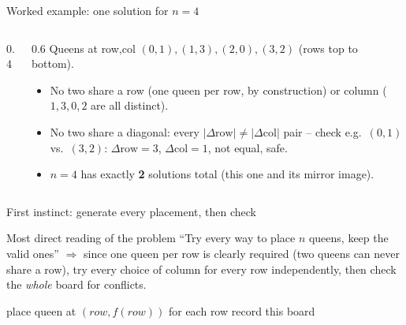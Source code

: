 \documentclass[11pt,aspectratio=169]{beamer}
\begin{document}
\begin{frame}{Worked example: one solution for $n=4$}
  \begin{columns}
  \begin{column}{0.4\textwidth}
  \begin{center}
  \end{center}
  \end{column}
  \begin{column}{0.6\textwidth}
  \small
  Queens at row,col $(0,1), (1,3), (2,0), (3,2)$ (rows top to bottom).
  \begin{itemize}
    \item No two share a row (one queen per row, by construction) or column
    ($1,3,0,2$ are all distinct).
    \item No two share a diagonal: every $|\Delta\text{row}| \ne |\Delta\text{col}|$
    pair -- check e.g.\ $(0,1)$ vs.\ $(3,2)$: $\Delta\text{row}=3$,
    $\Delta\text{col}=1$, not equal, safe.
    \item $n=4$ has exactly \textbf{2} solutions total (this one and its mirror
    image).
  \end{itemize}
  \end{column}
  \end{columns}
\end{frame}

\begin{frame}{First instinct: generate every placement, then check}
  \begin{block}{Most direct reading of the problem}
    ``Try every way to place $n$ queens, keep the valid ones'' $\Rightarrow$ since one
    queen per row is clearly required (two queens can never share a row), try every
    choice of column for every row independently, then check the \emph{whole} board
    for conflicts.
  \end{block}
  \begin{algorithmic}[1]
     
      \State place queen at $(row, f(row))$ for each row
       
        \State record this board
      \EndIf
    \EndFor
  \end{algorithmic}
\end{frame}
\end{document}
